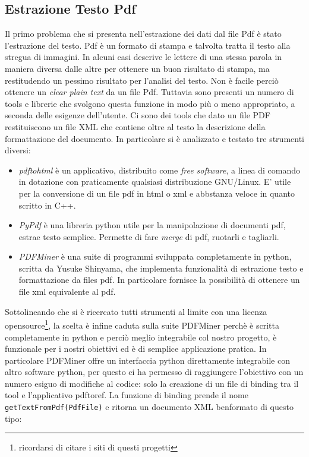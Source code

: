 \subsection{Estrazione Testo Pdf}
Il primo problema che si presenta nell'estrazione dei dati dal file Pdf è stato l'estrazione del testo. Pdf è un formato di stampa e talvolta tratta il testo alla stregua di immagini. In alcuni casi descrive le lettere di una stessa parola in maniera diversa dalle altre per ottenere un buon risultato di stampa, ma restitudendo un pessimo risultato per l'analisi del testo. Non è facile perciò ottenere un \textit{clear plain text} da un file Pdf. Tuttavia sono presenti un numero di tools e librerie che svolgono questa funzione in modo più o meno appropriato, a seconda delle esigenze dell'utente. Ci sono dei tools che dato un file PDF restituiscono un file XML che contiene oltre al testo la descrizione della formattazione del documento. 
In particolare si è analizzato e testato tre strumenti diversi:
\begin{itemize}
 \item \textit{pdftohtml} è un applicativo, distribuito come \textit{free software}, a linea di comando in dotazione con praticamente qualsiasi distribuzione GNU/Linux. E' utile per la conversione di un file pdf in html o xml e abbstanza veloce in quanto scritto in C++.
 \item \textit{PyPdf} è una libreria python utile per la manipolazione di documenti pdf, estrae testo semplice. Permette di fare \textit{merge} di pdf, ruotarli e tagliarli.
 \item \textit{PDFMiner} è una suite di programmi sviluppata completamente in python, scritta da Yusuke Shinyama, che implementa funzionalità di estrazione testo e formattazione da files pdf. In particolare fornisce la possibilità di ottenere un file xml equivalente al pdf.
\end{itemize}

Sottolineando che si è ricercato tutti strumenti al limite con una licenza opensource\footnote{ricordarsi di citare i siti di questi progetti}, la scelta è infine caduta sulla suite PDFMiner perchè è scritta completamente in python e perciò meglio integrabile col nostro progetto, è funzionale per i nostri obiettivi ed è di semplice applicazione pratica.
In particolare PDFMiner offre un interfaccia python direttamente integrabile con altro software python, per questo ci ha permesso di raggiungere l'obiettivo con un numero esiguo di modifiche al codice: solo la creazione di un file di binding tra il tool e l'applicativo pdftoref. La funzione di binding prende il nome \texttt{getTextFromPdf(PdfFile)} e ritorna un documento XML benformato di questo tipo:

